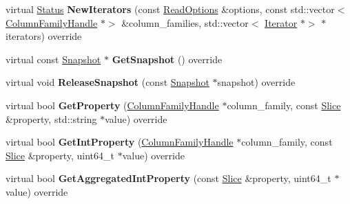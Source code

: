 \begin{DoxyCompactItemize}
\item 
virtual \hyperlink{classrocksdb_1_1Status}{Status} {\bfseries New\+Iterators} (const \hyperlink{structrocksdb_1_1ReadOptions}{Read\+Options} \&options, const std\+::vector$<$ \hyperlink{classrocksdb_1_1ColumnFamilyHandle}{Column\+Family\+Handle} $\ast$$>$ \&column\+\_\+families, std\+::vector$<$ \hyperlink{classrocksdb_1_1Iterator}{Iterator} $\ast$$>$ $\ast$iterators) override\hypertarget{classrocksdb_1_1StackableDB_aedefa103bcda7a45e6bcc1ca486156c0}{}\label{classrocksdb_1_1StackableDB_aedefa103bcda7a45e6bcc1ca486156c0}

\item 
virtual const \hyperlink{classrocksdb_1_1Snapshot}{Snapshot} $\ast$ {\bfseries Get\+Snapshot} () override\hypertarget{classrocksdb_1_1StackableDB_af9f61b60eed4cccd6200c46ba76e156c}{}\label{classrocksdb_1_1StackableDB_af9f61b60eed4cccd6200c46ba76e156c}

\item 
virtual void {\bfseries Release\+Snapshot} (const \hyperlink{classrocksdb_1_1Snapshot}{Snapshot} $\ast$snapshot) override\hypertarget{classrocksdb_1_1StackableDB_ac6cb8038e9f87541763fab316c68e94b}{}\label{classrocksdb_1_1StackableDB_ac6cb8038e9f87541763fab316c68e94b}

\item 
virtual bool {\bfseries Get\+Property} (\hyperlink{classrocksdb_1_1ColumnFamilyHandle}{Column\+Family\+Handle} $\ast$column\+\_\+family, const \hyperlink{classrocksdb_1_1Slice}{Slice} \&property, std\+::string $\ast$value) override\hypertarget{classrocksdb_1_1StackableDB_abf55bc257a71446b000e0fd5700af4e2}{}\label{classrocksdb_1_1StackableDB_abf55bc257a71446b000e0fd5700af4e2}

\item 
virtual bool {\bfseries Get\+Int\+Property} (\hyperlink{classrocksdb_1_1ColumnFamilyHandle}{Column\+Family\+Handle} $\ast$column\+\_\+family, const \hyperlink{classrocksdb_1_1Slice}{Slice} \&property, uint64\+\_\+t $\ast$value) override\hypertarget{classrocksdb_1_1StackableDB_a225f69fd57973e18a71aebf9129fe6dc}{}\label{classrocksdb_1_1StackableDB_a225f69fd57973e18a71aebf9129fe6dc}

\item 
virtual bool {\bfseries Get\+Aggregated\+Int\+Property} (const \hyperlink{classrocksdb_1_1Slice}{Slice} \&property, uint64\+\_\+t $\ast$value) override\hypertarget{classrocksdb_1_1StackableDB_adb52fb9c4b45b4c52f7931e38ebea27e}{}\label{classrocksdb_1_1StackableDB_adb52fb9c4b45b4c52f7931e38ebea27e}


\end{DoxyCompactItemize}
